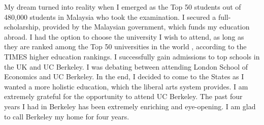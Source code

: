 \documentclass{article}
\begin{document}
My dream turned into reality when I emerged as the Top 50 students out of 480,000 students in Malaysia who took the examination. I secured a full-scholarship, provided by the Malaysian government, which funds my education abroad. I had the option to choose the university I wish to attend, as long as they are ranked among the Top 50 universities in the world , according to the TIMES higher education rankings. I successfully gain admissions to top schools in the UK and UC Berkeley. I was debating between attending London School of Economics and UC Berkeley. In the end, I decided to come to the States as I wanted a more holistic education, which the liberal arts system provides. I am extremely grateful for the opportunity to attend UC Berkeley. The past four years I had in Berkeley has been extremely enriching and eye-opening. I am glad to call Berkeley my home for four years. 
\end{document}
